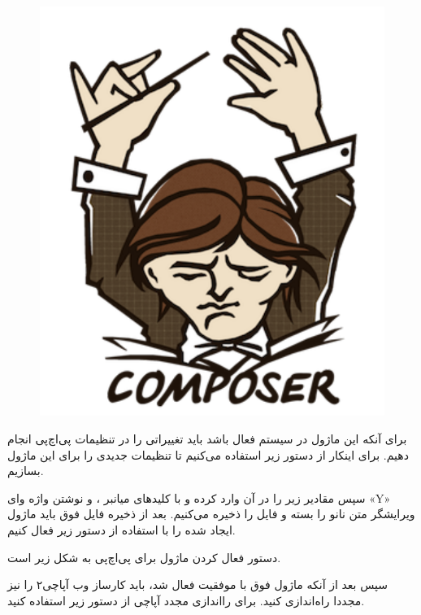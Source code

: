 \begin{figure}
    \includegraphics[width=.50\textwidth ,height=.60\textwidth]{Pic/COMPOSER}
    \caption{ 
    }
    \label{PHP-COMPOSER}
\end{figure}

\begin{latin}  
    
    \end{latin}
 برای آنکه این ماژول در سیستم فعال باشد باید تغییراتی را در تنظیمات پی‌اچ‌پی انجام دهیم. برای اینکار از دستور زیر استفاده می‌کنیم تا تنظیمات جدیدی را برای این ماژول بسازیم.
\newline

\begin{latin}  
    
\end{latin}

سپس مقادیر زیر را در آن وارد کرده و با کلید‌های میانبر 
، و نوشتن واژه وای «Y» ویرایشگر متن نانو را بسته و فایل را ذخیره می‌کنیم. بعد از ذخیره فایل فوق باید ماژول ایجاد شده را با استفاده از دستور زیر فعال کنیم.
\newline

\begin{latin}  
    
\end{latin}
دستور فعال کردن ماژول برای پی‌اچ‌پی به شکل زیر است.
\newline

\begin{latin}  
    
\end{latin}
سپس بعد از آنکه ماژول فوق با موفقیت فعال شد، باید کارساز وب آپاچی۲ را نیز مجددا راه‌اندازی کنید. برای را‌اندازی مجدد آپاچی از دستور زیر استفاده کنید.
\newline

